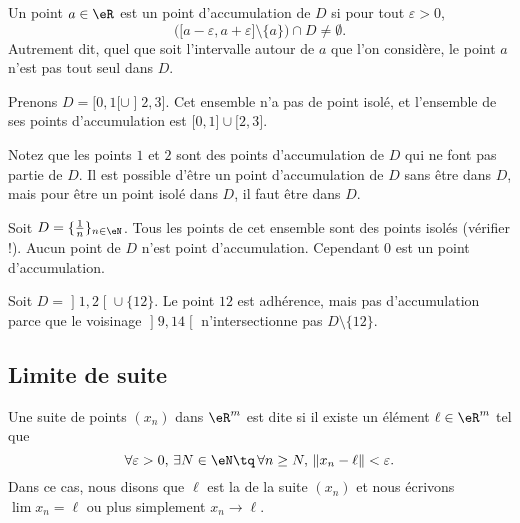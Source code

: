 \begin{lemma}
	Un point \( a\in \eR\) est un point d'accumulation de \( D\) si pour tout \( \varepsilon>0\),
	\begin{equation}
		\Big( \mathopen[ a-\varepsilon , a+\varepsilon \mathclose]\setminus\{ a \} \Big)\cap D\neq\emptyset.
	\end{equation}
	Autrement dit, quel que soit l'intervalle autour de  \( a\) que l'on considère, le point \( a\) n'est pas tout seul dans \( D\).
\end{lemma}

\begin{example}
	Prenons \( D=\mathopen[ 0 , 1 [\cup\mathopen] 2 , 3 \mathclose]\). Cet ensemble n'a pas de point isolé, et l'ensemble de ses points d'accumulation est \( \mathopen[ 0 , 1 \mathclose]\cup\mathopen[ 2,3  \mathclose]\).

	Notez que les points \( 1\) et \( 2\) sont des points d'accumulation de \( D\) qui ne font pas partie de \( D\). Il est possible d'être un point d'accumulation de \( D\) sans être dans \( D\), mais pour être un point isolé dans \( D\), il faut être dans \( D\).
\end{example}

\begin{example}
	Soit \( D=\{ \frac{1}{ n }\}_{n\in\eN}\). Tous les points de cet ensemble sont des points isolés (vérifier !).  Aucun point de \( D\) n'est point d'accumulation. Cependant \( 0\) est un point d'accumulation.
\end{example}

\begin{example}     \label{EXooWOYQooJolaTV}
	Soit \( D=\mathopen] 1 , 2 \mathclose[\cup\{ 12 \}\). Le point \( 12\) est adhérence, mais pas d'accumulation parce que le voisinage \( \mathopen] 9 , 14 \mathclose[\) n'intersectionne pas \( D\setminus \{ 12 \}\).
\end{example}

\subsection{Limite de suite}

\begin{definition}
	Une suite de points \( (x_n)\) dans \( \eR^m\) est dite  si il existe un élément \( \ell\in\eR^m\) tel que
	\begin{equation}	\label{EqCondLimSuite}
		\forall\varepsilon>0,\,\exists N\in \eN\tq\,\forall n\geq N,\,\| x_n-\ell \|<\varepsilon.
	\end{equation}
	Dans ce cas, nous disons que \( \ell\) est la  de la suite \( (x_n)\) et nous écrivons \( \lim x_n=\ell\) ou plus simplement \( x_n\to \ell\).
\end{definition}

